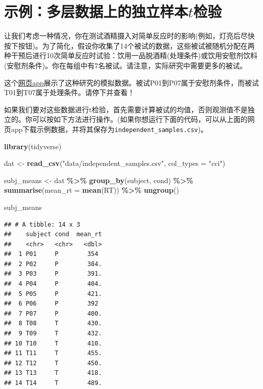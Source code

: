 \documentclass[
]{book}
\newenvironment{Shaded}{\begin{snugshade}}{\end{snugshade}}
\newcommand{\AttributeTok}[1]{\textcolor[rgb]{0.13,0.29,0.53}{#1}}
\newcommand{\FunctionTok}[1]{\textcolor[rgb]{0.13,0.29,0.53}{\textbf{#1}}}
\newcommand{\NormalTok}[1]{#1}
\newcommand{\OtherTok}[1]{\textcolor[rgb]{0.56,0.35,0.01}{#1}}
\newcommand{\SpecialCharTok}[1]{\textcolor[rgb]{0.81,0.36,0.00}{\textbf{#1}}}
\newcommand{\StringTok}[1]{\textcolor[rgb]{0.31,0.60,0.02}{#1}}
\begin{document}
\hypertarget{ux793aux4f8bux591aux5c42ux6570ux636eux4e0aux7684ux72ecux7acbux6837ux672ctux68c0ux9a8c}{%
\section{\texorpdfstring{示例：多层数据上的独立样本\(t\)检验}{示例：多层数据上的独立样本t检验}}\label{ux793aux4f8bux591aux5c42ux6570ux636eux4e0aux7684ux72ecux7acbux6837ux672ctux68c0ux9a8c}}

让我们考虑一种情况，你在测试酒精摄入对简单反应时的影响(例如，灯亮后尽快按下按钮)。为了简化，假设你收集了14个被试的数据，这些被试被随机分配在两种干预后进行10次简单反应时试验：饮用一品脱酒精(处理条件)或饮用安慰剂饮料(安慰剂条件)。你在每组中有7名被试。请注意，实际研究中需要更多的被试。

这个\href{https://rstudio-connect.psy.gla.ac.uk/icc}{网页app}展示了这种研究的模拟数据。被试P01到P07属于安慰剂条件，而被试T01到T07属于处理条件。请停下并查看！

如果我们要对这些数据进行t检验，首先需要计算被试的均值，否则观测值不是独立的。你可以按如下方法进行操作。(如果你想运行下面的代码，可以从上面的网页app下载示例数据，并将其保存为\texttt{independent\_samples.csv})。

\begin{Shaded}
\begin{Highlighting}[]
\FunctionTok{library}\NormalTok{(tidyverse)}

\NormalTok{dat }\OtherTok{\textless{}{-}} \FunctionTok{read\_csv}\NormalTok{(}\StringTok{"data/independent\_samples.csv"}\NormalTok{, }\AttributeTok{col\_types =} \StringTok{"cci"}\NormalTok{)}

\NormalTok{subj\_means }\OtherTok{\textless{}{-}}\NormalTok{ dat }\SpecialCharTok{\%\textgreater{}\%}
  \FunctionTok{group\_by}\NormalTok{(subject, cond) }\SpecialCharTok{\%\textgreater{}\%}
  \FunctionTok{summarise}\NormalTok{(}\AttributeTok{mean\_rt =} \FunctionTok{mean}\NormalTok{(RT)) }\SpecialCharTok{\%\textgreater{}\%}
  \FunctionTok{ungroup}\NormalTok{()}

\NormalTok{subj\_means}
\end{Highlighting}
\end{Shaded}

\begin{verbatim}
## # A tibble: 14 x 3
##    subject cond  mean_rt
##    <chr>   <chr>   <dbl>
##  1 P01     P        354 
##  2 P02     P        384.
##  3 P03     P        391.
##  4 P04     P        404.
##  5 P05     P        421.
##  6 P06     P        392 
##  7 P07     P        400.
##  8 T08     T        430.
##  9 T09     T        432.
## 10 T10     T        410.
## 11 T11     T        455.
## 12 T12     T        450.
## 13 T13     T        418.
## 14 T14     T        489.
\end{verbatim}
\end{document}
